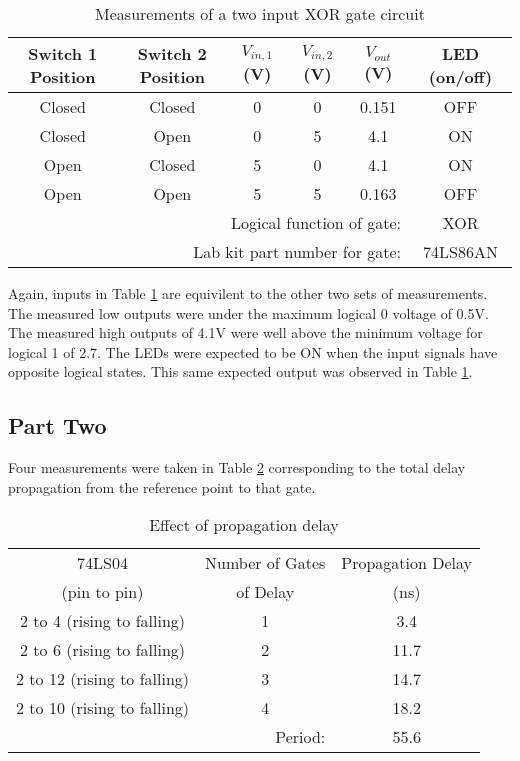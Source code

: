 \documentclass[CMPE]{KGCOEReport}
\begin{document}
\begin{table}[h]
\renewcommand{\arraystretch}{1.2}
\caption{Measurements of a two input XOR gate circuit}
\begin{center}
\begin{tabular}{|c|c|c|c|c|c|}
\hline
Switch 1 Position & Switch 2 Position & $V_{in,1}$ (V) & $V_{in,2}$ (V) & $V_{out}$ (V) & LED (on/off)\\\hline

Closed & Closed & 0 & 0 & 0.151 & OFF \\\hline
Closed & Open   & 0 & 5 & 4.1   & ON \\\hline
Open   & Closed & 5 & 0 & 4.1   & ON \\\hline
Open   & Open   & 5 & 5 & 0.163 & OFF \\\hline
\multicolumn{5}{|r|}{Logical function of gate: } & XOR  \\\hline
\multicolumn{5}{|r|}{Lab kit part number for gate: } & 74LS86AN  \\\hline

\end{tabular}
\end{center}
\label{tab:XOR}
\end{table}

Again, inputs in Table \ref{tab:XOR} are equivilent to the other two sets of measurements. The measured low outputs were under the maximum logical 0 voltage of 0.5V. The measured high outputs of 4.1V were well above the minimum voltage for logical 1 of 2.7. The LEDs were expected to be ON when the input signals have opposite logical states. This same expected output was observed in Table \ref{tab:XOR}.

\subsection*{Part Two}

Four measurements were taken in Table \ref{tab:INV} corresponding to the total delay propagation from the reference point to that gate.

\begin{table}[h]
\renewcommand{\arraystretch}{1.2}
\caption{Effect of propagation delay}
\begin{center}
\begin{tabular}{|c|c|c|}
\hline

74LS04 & Number of Gates & Propagation Delay \\
(pin to pin) & of Delay & (ns)\\\hline

2 to 4 (rising to falling) & 1 & 3.4\\\hline
2 to 6 (rising to falling) & 2 & 11.7\\\hline
2 to 12 (rising to falling) & 3 & 14.7\\\hline
2 to 10 (rising to falling) & 4 & 18.2\\\hline
\multicolumn{2}{|r|}{Period: } & 55.6  \\\hline

\end{tabular}
\end{center}
\label{tab:INV}
\end{table}
\end{document}
